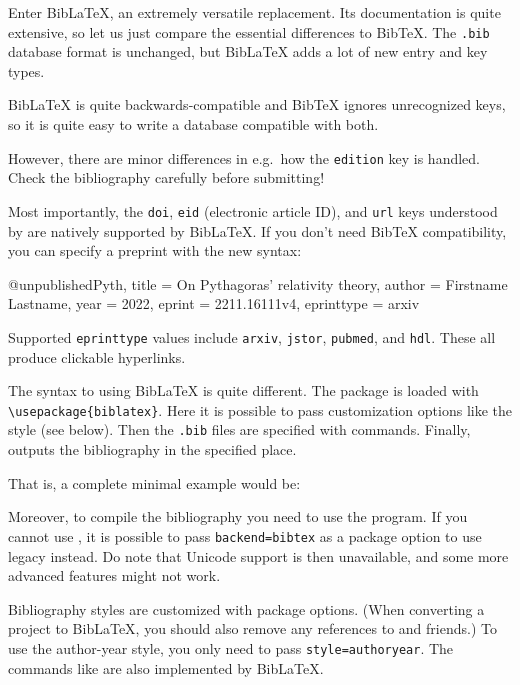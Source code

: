 Enter BibLaTeX, an extremely versatile replacement.
Its documentation \cite{biblatex} is quite extensive,
so let us just compare the essential differences to BibTeX.
The \verb|.bib| database format is unchanged,
but BibLaTeX adds a lot of new entry and key types.

\begin{gotcha}
BibLaTeX is quite backwards-compatible and BibTeX ignores unrecognized keys,
so it is quite easy to write a database compatible with both.

However, there are minor differences in e.g.\ how the \verb|edition| key is handled.
Check the bibliography carefully before submitting!
\end{gotcha}

Most importantly, the \verb|doi|, \verb|eid| (electronic article ID), and \verb|url| keys
understood by  are natively supported by BibLaTeX.
If you don't need BibTeX compatibility,
you can specify a preprint with the new syntax:
\begin{ExampleCode}
@unpublished{Pyth,
    title = {On {Pythagoras'} relativity theory},
    author = {Firstname Lastname},
    year = {2022},
    eprint = {2211.16111v4},
    eprinttype = {arxiv}
}
\end{ExampleCode}
%
Supported \verb|eprinttype| values include \verb|arxiv|, \verb|jstor|, \verb|pubmed|, and \verb|hdl|.
These all produce clickable hyperlinks.

The syntax to using BibLaTeX is quite different.
The package is loaded with \verb|\usepackage{biblatex}|.
Here it is possible to pass customization options like the style (see below).
Then the \verb|.bib| files are specified with  commands.
Finally,  outputs the bibliography in the specified place.

That is, a complete minimal example would be:
\begin{ExampleCode}
\usepackage{biblatex}


\printbibliography
\end{ExampleCode}

Moreover, to compile the bibliography you need to use the  program.
If you cannot use , it is possible to pass \verb|backend=bibtex|
as a package option to use legacy  instead.
Do note that Unicode support is then unavailable,
and some more advanced features might not work.

Bibliography styles are customized with package options.
(When converting a project to BibLaTeX,
you should also remove any references to  and friends.)
To use the author-year style, you only need to pass \verb|style=authoryear|.
The  commands like 
are also implemented by BibLaTeX.

